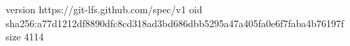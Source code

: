 version https://git-lfs.github.com/spec/v1
oid sha256:a77d1212df8890dfc8cd318ad3bd686dbb5295a47a405fa0e6f7faba4b76197f
size 4114
